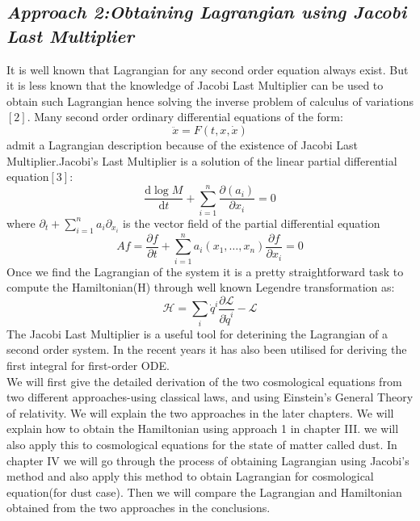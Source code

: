 \documentclass[14pt]{extarticle}
\begin{document}
\subsection*{\textit{Approach 2:Obtaining Lagrangian using Jacobi Last Multiplier}}

It is well known that Lagrangian for any second order equation always exist. But it is less known that the knowledge of Jacobi Last Multiplier can be used to obtain such Lagrangian hence solving the inverse problem of calculus of variations$[2]$. Many second order ordinary differential equations of the form:\\
\begin{equation}
\ddot{x}=F(t, x, \dot{x})
\end{equation} 
admit a Lagrangian description because of the existence of Jacobi Last Multiplier.Jacobi's Last Multiplier is a solution of the linear partial differential equation$[3]$:\\
\begin{equation}
\frac{\mathrm{d} \log M}{\mathrm{d} t}+\sum_{i=1}^{n} \frac{\partial\left(a_{i}\right)}{\partial x_{i}}=0
\end{equation}
where $\partial_{t}+\sum_{i=1}^{n} a_{i} \partial_{x_{i}}$ is the vector field of the partial differential equation\\
\begin{equation}
A f=\frac{\partial f}{\partial t}+\sum_{i=1}^{n} a_{i}\left(x_{1}, \ldots, x_{n}\right) \frac{\partial f}{\partial x_{i}}=0
\end{equation}
Once we find the Lagrangian of the system it is a pretty straightforward task to compute the Hamiltonian(H) through well known Legendre transformation as:\\
\begin{equation}
\mathcal{H}=\sum_{i} \dot{q}^{i} \frac{\partial \mathcal{L}}{\partial \dot{q}^{i}}-\mathcal{L}
\end{equation}
The Jacobi Last Multiplier is a useful tool for deterining the Lagrangian of a second order system. In the recent years it has also been utilised for deriving the first integral for first-order ODE.\\
We will first give the detailed derivation of the two cosmological equations from two different approaches-using classical laws, and using Einstein's General Theory of relativity. We will explain the two approaches in the later chapters. We will explain how to obtain the Hamiltonian using approach 1 in chapter III. we will also apply this to cosmological equations for the state of matter called dust. In chapter IV we will go through the process of obtaining Lagrangian using Jacobi's method and also apply this method to obtain Lagrangian for cosmological equation(for dust case). Then we will compare the Lagrangian and Hamiltonian obtained from the two approaches in the conclusions.
\pagebreak
\end{document}
